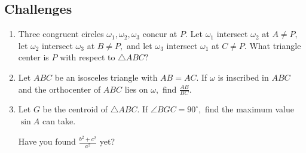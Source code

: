 \begin{enumerate}
\begin{solu}
\begin{addsol}
{\begin{center}
    \end{center}}
    \end{addsol}
    \end{solu}
\end{enumerate}

\subsection{Challenges}

\begin{enumerate}
    \item Three congruent circles $\omega_1,\omega_2,\omega_3$ concur at $P.$ Let $\omega_1$ intersect $\omega_2$ at $A\neq P,$ let $\omega_2$ intersect $\omega_3$ at $B\neq P,$ and let $\omega_3$ intersect $\omega_1$ at $C\neq P.$ What triangle center is $P$ with respect to $\triangle ABC?$
    
    \item Let $ABC$ be an isosceles triangle with $AB=AC.$ If $\omega$ is inscribed in $ABC$ and the orthocenter of $ABC$ lies on $\omega,$ find $\frac{AB}{BC}.$

    \item Let $G$ be the centroid of $\triangle ABC.$ If $\angle BGC=90^{\circ},$ find the maximum value $\sin A$ can take.
    \begin{hint}
    \begin{addhint}
    {Have you found $\frac{b^2+c^2}{a^2}$ yet?}
    \end{addhint}
    \end{hint}
\end{enumerate}